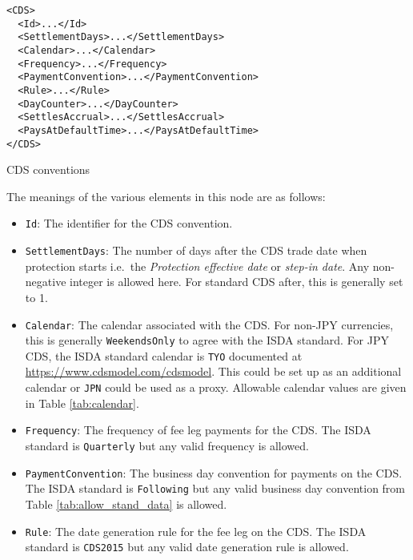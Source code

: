 \begin{listing}[H]
\begin{verbatim}
<CDS>
  <Id>...</Id>
  <SettlementDays>...</SettlementDays>
  <Calendar>...</Calendar>
  <Frequency>...</Frequency>
  <PaymentConvention>...</PaymentConvention>
  <Rule>...</Rule>
  <DayCounter>...</DayCounter>
  <SettlesAccrual>...</SettlesAccrual>
  <PaysAtDefaultTime>...</PaysAtDefaultTime>
</CDS>
\end{verbatim}
\caption{CDS conventions}
\label{lst:cds_conventions}
\end{listing}

The meanings of the various elements in this node are as follows:
\begin{itemize}

\item \lstinline!Id!:
The identifier for the CDS convention.

\item \lstinline!SettlementDays!:
The number of days after the CDS trade date when protection starts i.e.\ the \textit{Protection effective date} or \textit{step-in date}. Any non-negative integer is allowed here. For standard CDS after, this is generally set to 1.

\item \lstinline!Calendar!:
The calendar associated with the CDS. For non-JPY currencies, this is generally \lstinline!WeekendsOnly! to agree with the ISDA standard. For JPY CDS, the ISDA standard calendar is \lstinline!TYO! documented at \url{https://www.cdsmodel.com/cdsmodel}. This could be set up as an additional calendar or \lstinline!JPN! could be used as a proxy. Allowable calendar values are given in Table \ref{tab:calendar}.

\item \lstinline!Frequency!:
The frequency of fee leg payments for the CDS. The ISDA standard is \lstinline!Quarterly! but any valid frequency is allowed.

\item \lstinline!PaymentConvention!:
The business day convention for payments on the CDS. The ISDA standard is \lstinline!Following! but any valid business day convention from Table \ref{tab:allow_stand_data} is allowed.

\item \lstinline!Rule!:
The date generation rule for the fee leg on the CDS. The ISDA standard is \lstinline!CDS2015! but any valid date generation rule is allowed.


\end{itemize}
